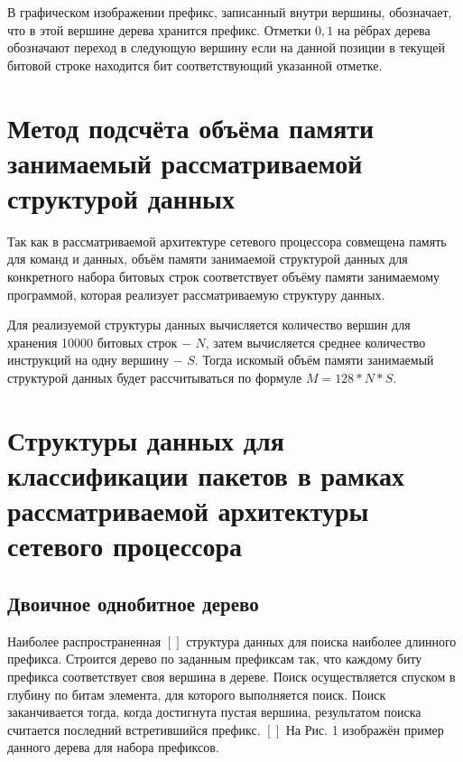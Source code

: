 \documentclass[a4peper, 12pt, titlepage, finall]{report}
\begin{document}
        В графическом изображении префикс, записанный внутри вершины, обозначает, что в этой вершине дерева хранится префикс.
        Отметки ${0,1}$ на рёбрах дерева обозначают переход в следующую вершину если на данной позиции в текущей битовой строке находится бит соответствующий указанной отметке.
    \section{Метод подсчёта объёма памяти занимаемый рассматриваемой структурой данных}
        Так как в рассматриваемой архитектуре сетевого процессора совмещена память для команд и данных, объём памяти занимаемой структурой данных 
        для конкретного набора битовых строк соответствует объёму памяти занимаемому программой, которая реализует рассматриваемую структуру данных.

        Для реализуемой структуры данных вычисляется количество вершин для хранения 10000 битовых строк $-$ $N$, затем вычисляется среднее количество инструкций на 
        одну вершину $-$ $S$. Тогда искомый объём памяти занимаемый структурой данных будет рассчитываться по формуле $M = 128 * N * S$.
    \section{Структуры данных для классификации пакетов в рамках рассматриваемой архитектуры сетевого процессора}
        \subsection{Двоичное однобитное дерево}
            Наиболее распространенная $[ ]$ структура данных для поиска наиболее длинного префикса. Строится дерево по заданным префиксам
            так, что каждому биту префикса соответствует своя вершина в дереве. 
            Поиск осуществляется спуском в глубину по битам элемента, для которого выполняется поиск. 
            Поиск заканчивается тогда, когда достигнута пустая вершина, результатом поиска считается последний встретившийся префикс. $[ ]$
            На Рис. 1 изображён пример данного дерева для набора префиксов.
\end{document}
